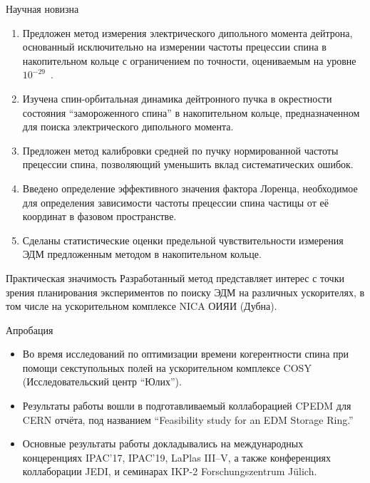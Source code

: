 \documentclass[14pt]{beamer}
\begin{document}
\begin{frame}{Научная новизна}
	\begin{enumerate}
		\item Предложен метод измерения электрического дипольного момента дейтрона,
		основанный исключительно на измерении частоты прецессии спина в накопительном кольце 
		с ограничением по точности, оцениваемым на уровне $10^{-29}$~\ecm.
		\item Изучена спин-орбитальная динамика дейтронного пучка в окрестности состояния ``замороженного спина''
		в накопительном кольце, предназначенном для поиска электрического дипольного момента. 
	\end{enumerate}
\end{frame}
\begin{frame}
	\begin{enumerate} \setcounter{enumi}{2}
		\item Предложен метод калибровки средней по пучку нормированной частоты прецессии спина, позволяющий уменьшить вклад систематических ошибок.
		\item Введено определение эффективного значения фактора Лоренца, необходимое для 
		определения зависимости частоты прецессии спина частицы от её координат в фазовом пространстве. 
		\item Сделаны статистические оценки предельной чувствительности измерения ЭДМ предложенным методом в накопительном кольце. 
	\end{enumerate}
\end{frame}

\begin{frame}{Практическая значимость}
	Разработанный метод представляет интерес с точки зрения планирования экспериментов по поиску ЭДМ
	на различных ускорителях, в том числе на ускорительном комплексе NICA ОИЯИ (Дубна).
\end{frame}

\begin{frame}{Апробация}
	\begin{itemize}
		\item Во время исследований по оптимизации времени когерентности спина при помощи секступольных полей на ускорительном комплексе COSY (Исследовательский центр ``Юлих'').
		\item Результаты работы вошли в подготавливаемый коллаборацией CPEDM для CERN отчёта, под названием ``Feasibility study for an EDM Storage Ring.''
		\item Основные результаты работы докладывались на международных концеренциях IPAC'17, IPAC'19, LaPlas III--V, а также конференциях коллаборации JEDI, и семинарах IKP-2 Forschungszentrum J\"ulich.
	\end{itemize}
\end{frame}
\end{document}
